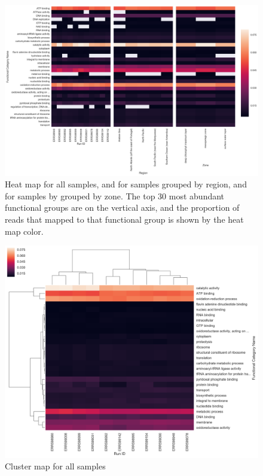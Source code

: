 \documentclass[12pt,a4paper,]{article}
\begin{document}
\begin{figure}
\centering
\includegraphics{imgs/heat/heat_group.png}
\caption{Heat map for all samples, and for samples grouped by region,
and for samples by grouped by zone. The top 30 most abundant functional
groups are on the vertical axis, and the proportion of reads that mapped
to that functional group is shown by the heat map
color.\label{fig:heat_group}}
\end{figure}

\begin{figure}
\centering
\includegraphics{imgs/cluster/cluster_all.png}
\caption{Cluster map for all samples\label{fig:cluster_all}}
\end{figure}
\end{document}
